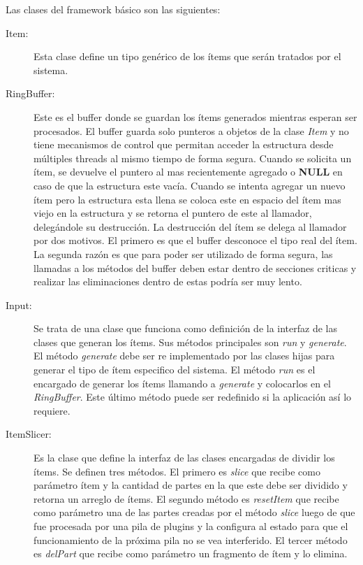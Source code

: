 Las clases del framework básico son las siguientes:

\begin{description}

\item[Item:] Esta clase define un tipo genérico de los ítems que serán tratados
	por el sistema.

\item[RingBuffer:] Este es el buffer donde se guardan los ítems generados
	mientras esperan ser procesados. El buffer guarda solo punteros a
	objetos de la clase \emph{Item} y no tiene mecanismos de control que
	permitan acceder la estructura desde múltiples threads al mismo tiempo
	de forma segura. Cuando se solicita un ítem, se devuelve el puntero al
	mas recientemente agregado o \textbf{NULL} en caso de que la estructura
	este vacía. Cuando se intenta agregar un nuevo ítem pero la estructura
	esta llena se coloca este en espacio del ítem mas viejo en la estructura
	y se retorna el puntero de este al llamador, delegándole su destrucción.
	La destrucción del ítem se delega al llamador por dos motivos. El
	primero es que el buffer desconoce el tipo real del ítem. La segunda
	razón es que para poder ser utilizado de forma segura, las llamadas a
	los métodos del buffer deben estar dentro de secciones criticas y
	realizar las eliminaciones dentro de estas podría ser muy lento.

\item[Input:] Se trata de una clase que funciona como definición de la interfaz
	de las clases que generan los ítems. Sus métodos principales son
	\emph{run} y \emph{generate}. El método \emph{generate} debe ser re
	implementado por las clases hijas para generar el tipo de ítem
	especifico del sistema. El método \emph{run} es el encargado de generar
	los ítems llamando a \emph{generate} y colocarlos en el
	\emph{RingBuffer}. Este último método puede ser redefinido si la
	aplicación así lo requiere.

\item[ItemSlicer:] Es la clase que define la interfaz de las clases encargadas
	de dividir los ítems. Se definen tres métodos. El primero es
	\emph{slice} que recibe como parámetro ítem y la cantidad de partes en
	la que este debe ser dividido y retorna un arreglo de ítems. El segundo
	método es \emph{resetItem} que recibe como parámetro una de las partes
	creadas por el método \emph{slice} luego de que fue procesada por una
	pila de plugins y la configura al estado para que el funcionamiento de
	la próxima pila no se vea interferido. El tercer método es
	\emph{delPart} que recibe como parámetro un fragmento de ítem y lo
	elimina.


\end{description}
